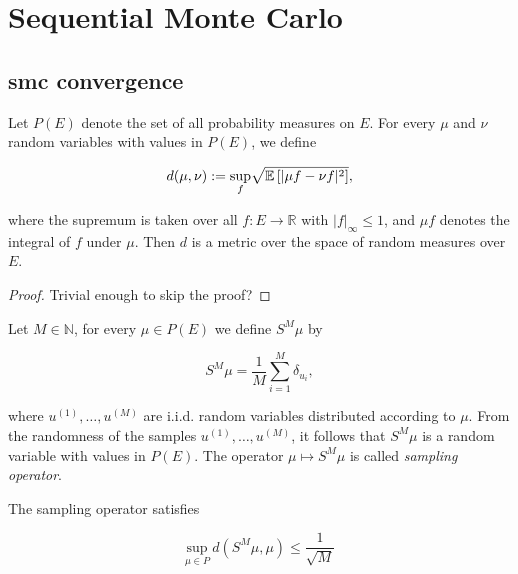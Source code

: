 \section{Sequential Monte Carlo}

\subsection{smc convergence}

\begin{lemma}
  Let $P(E)$ denote the set of all probability measures on $E$. For every $\mu$ and $\nu$ random variables with values in $P(E)$, we define

  \begin{equation*}
    d(\mu, \nu) := \underset{f}{\text{sup}} \sqrt{\mathbb{E}\left[|\mu f - \nu f|^2\right]},
  \end{equation*}

  where the supremum is taken over all $f : E \rightarrow \mathbb{R}$ with $|f|_\infty \le 1$, and $\mu f$ denotes the integral of $f$ under $\mu$. Then $d$ is a metric over the space of random measures over $E$.
\end{lemma}

\begin{proof} Trivial enough to skip the proof?
\end{proof}

\begin{definition}
  Let $M \in \mathbb{N}$, for every $\mu \in P(E)$ we define $S^M\mu$ by

  \begin{equation*}
    S^M\mu = \frac1{M}\sum_{i=1}^M\delta_{u_i},
  \end{equation*}

  where $u^{(1)}, \ldots, u^{(M)}$ are i.i.d. random variables distributed according to $\mu$. From the randomness of the samples $u^{(1)}, \ldots, u^{(M)}$, it follows that $S^M\mu$ is a random variable with values in $P(E)$. The operator $\mu \mapsto S^M\mu$ is called \textit{sampling operator}.
\end{definition}

\begin{lemma}\label{sampling-bound}
  The sampling operator satisfies

  \begin{equation*}
    \underset{\mu \in P}{\text{sup}}\ d(S^M\mu, \mu) \le \frac1{\sqrt{M}}
  \end{equation*}
\end{lemma}


